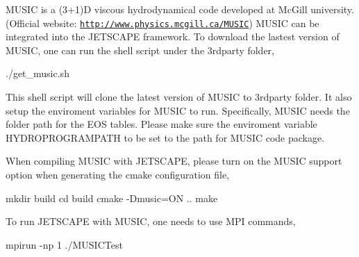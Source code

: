 M\+U\+S\+IC is a (3+1)D viscous hydrodynamical code developed at Mc\+Gill university. (Official website\+: \href{http://www.physics.mcgill.ca/MUSIC}{\tt http\+://www.\+physics.\+mcgill.\+ca/\+M\+U\+S\+IC}) M\+U\+S\+IC can be integrated into the J\+E\+T\+S\+C\+A\+PE framework. To download the lastest version of M\+U\+S\+IC, one can run the shell script under the 3rdparty folder,


\begin{DoxyCode}
./get\_music.sh
\end{DoxyCode}


This shell script will clone the latest version of M\+U\+S\+IC to 3rdparty folder. It also setup the enviroment variables for M\+U\+S\+IC to run. Specifically, M\+U\+S\+IC needs the folder path for the E\+OS tables. Please make sure the enviroment variable H\+Y\+D\+R\+O\+P\+R\+O\+G\+R\+A\+M\+P\+A\+TH to be set to the path for M\+U\+S\+IC code package.

When compiling M\+U\+S\+IC with J\+E\+T\+S\+C\+A\+PE, please turn on the M\+U\+S\+IC support option when generating the cmake configuration file,


\begin{DoxyCode}
mkdir build
cd build
cmake -Dmusic=ON ..
make
\end{DoxyCode}


To run J\+E\+T\+S\+C\+A\+PE with M\+U\+S\+IC, one needs to use M\+PI commands,


\begin{DoxyCode}
mpirun -np 1 ./MUSICTest
\end{DoxyCode}
 